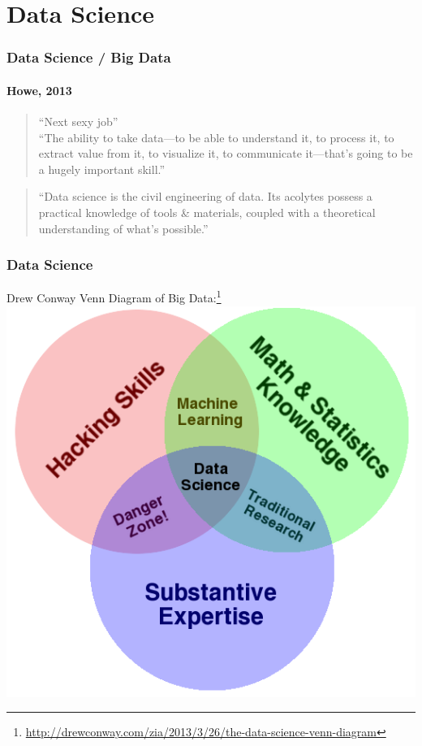 \documentclass[14pt]{beamer}
\begin{document}
\section{Data Science}

\begin{frame}
  \frametitle{Data Science / Big Data}
  \framesubtitle{Howe, 2013}
\vspace*{-.5em}
  \begin{quote}
    ``Next sexy job'' \\

    ``The ability to take data—to be able to understand it, to
process it, to extract value from it, to visualize it, to
communicate it—that’s going to be a hugely important skill.'' \\

  \hspace*{}
  \end{quote}

    \begin{quote}
``Data science is the civil engineering of data. Its acolytes
possess a practical knowledge of tools \& materials, coupled
with a theoretical understanding of what's possible.''\\
  \hspace*{}

  \end{quote}

\end{frame}

\begin{frame}
  \frametitle{Data Science}
\vspace*{-1em}
  \begin{center}
    Drew Conway Venn Diagram of Big
    Data:\footnote{\url{http://drewconway.com/zia/2013/3/26/the-data-science-venn-diagram}}\\
    \includegraphics[width=.5\textwidth]{img/Data_Science_VD}
  \end{center}
\end{frame}
\end{document}
